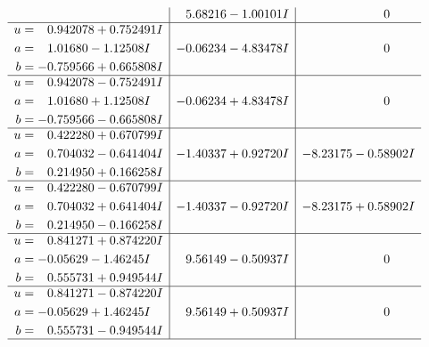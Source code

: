 \documentclass[1p]{elsarticle_modified}
\theoremstyle{definition}
\begin{document}
$$\begin{array}{c|c|c}
 & \phantom{-}5.68216 - 1.00101 I & \phantom{-0.000000 } 0 \\ \hline\begin{aligned}
u &= \phantom{-}0.942078 + 0.752491 I \\
a &= \phantom{-}1.01680 - 1.12508 I \\
b &= -0.759566 + 0.665808 I\end{aligned}
 & -0.06234 - 4.83478 I & \phantom{-0.000000 } 0 \\ \hline\begin{aligned}
u &= \phantom{-}0.942078 - 0.752491 I \\
a &= \phantom{-}1.01680 + 1.12508 I \\
b &= -0.759566 - 0.665808 I\end{aligned}
 & -0.06234 + 4.83478 I & \phantom{-0.000000 } 0 \\ \hline\begin{aligned}
u &= \phantom{-}0.422280 + 0.670799 I \\
a &= \phantom{-}0.704032 - 0.641404 I \\
b &= \phantom{-}0.214950 + 0.166258 I\end{aligned}
 & -1.40337 + 0.92720 I & -8.23175 - 0.58902 I \\ \hline\begin{aligned}
u &= \phantom{-}0.422280 - 0.670799 I \\
a &= \phantom{-}0.704032 + 0.641404 I \\
b &= \phantom{-}0.214950 - 0.166258 I\end{aligned}
 & -1.40337 - 0.92720 I & -8.23175 + 0.58902 I \\ \hline\begin{aligned}
u &= \phantom{-}0.841271 + 0.874220 I \\
a &= -0.05629 - 1.46245 I \\
b &= \phantom{-}0.555731 + 0.949544 I\end{aligned}
 & \phantom{-}9.56149 - 0.50937 I & \phantom{-0.000000 } 0 \\ \hline\begin{aligned}
u &= \phantom{-}0.841271 - 0.874220 I \\
a &= -0.05629 + 1.46245 I \\
b &= \phantom{-}0.555731 - 0.949544 I\end{aligned}
 & \phantom{-}9.56149 + 0.50937 I & \phantom{-0.000000 } 0\\
 \hline 
 \end{array}$$\newpage$$\begin{array}{c|c|c}  

\end{array}$$
\end{document}
